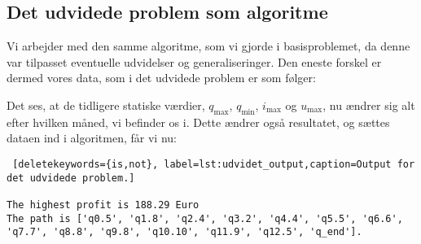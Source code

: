 \subsection{Det udvidede problem som algoritme}
Vi arbejder med den samme algoritme, som vi gjorde i basisproblemet, da denne var tilpasset eventuelle udvidelser og generaliseringer. Den eneste forskel er dermed vores data, som i det udvidede problem er som følger:

 

Det ses, at de tidligere statiske værdier, $q_{\max}$, $q_{\min}$, $i_{\max}$ og $u_{\max}$, nu ændrer sig alt efter hvilken måned, vi befinder os i. Dette ændrer også resultatet, og sættes dataen ind i algoritmen, får vi nu:


\begin{lstlisting} [deletekeywords={is,not}, label=lst:udvidet_output,caption=Output for det udvidede problem.]

The highest profit is 188.29 Euro
The path is ['q0.5', 'q1.8', 'q2.4', 'q3.2', 'q4.4', 'q5.5', 'q6.6', 'q7.7', 'q8.8', 'q9.8', 'q10.10', 'q11.9', 'q12.5', 'q_end'].

\end{lstlisting}